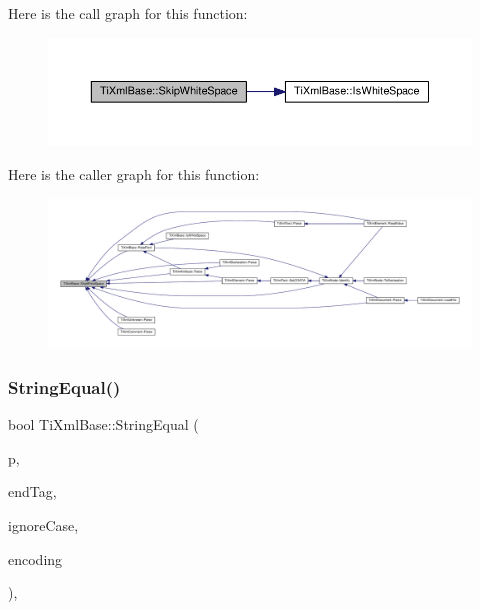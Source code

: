 Here is the call graph for this function\+:\nopagebreak
\begin{figure}[H]
\begin{center}
\leavevmode
\includegraphics[width=350pt]{class_ti_xml_base_ac0c3d66d8a9e6996a1fa016275e16875_cgraph}
\end{center}
\end{figure}
Here is the caller graph for this function\+:\nopagebreak
\begin{figure}[H]
\begin{center}
\leavevmode
\includegraphics[width=350pt]{class_ti_xml_base_ac0c3d66d8a9e6996a1fa016275e16875_icgraph}
\end{center}
\end{figure}
\mbox{\label{class_ti_xml_base_a51631e6986179558b9e5850723ed165a}} 
\subsubsection{\texorpdfstring{String\+Equal()}{StringEqual()}}
{\footnotesize\ttfamily bool Ti\+Xml\+Base\+::\+String\+Equal (\begin{DoxyParamCaption}\item[{const char $\ast$}]{p,  }\item[{const char $\ast$}]{end\+Tag,  }\item[{bool}]{ignore\+Case,  }\item[{\hyperlink{tinyxml_8h_a88d51847a13ee0f4b4d320d03d2c4d96}{Ti\+Xml\+Encoding}}]{encoding }\end{DoxyParamCaption})\hspace{0.3cm}{\ttfamily [static]}, {\ttfamily [protected]}}

